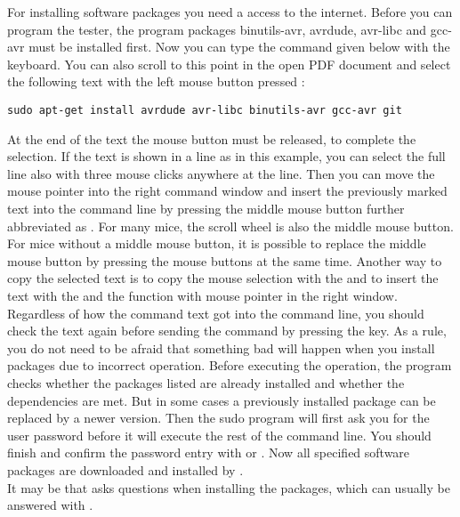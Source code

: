 For installing software packages you need a access to the internet.
Before you can program the tester, the program packages
binutils-avr, avrdude, avr-libc and gcc-avr must be installed first.
Now you can type the command given below with the keyboard.
You can also scroll to this point in the open PDF document and select the
following text with the left mouse button pressed \LMB :
\begin{large} \vspace{-0.4em} \begin{verbatim}
sudo apt-get install avrdude avr-libc binutils-avr gcc-avr git
\end{verbatim} \end{large}
At the end of the text the mouse button \LMB must be released,
to complete the selection.
If the text is shown in a line as in this example, you can select the full line also
with three \LMB mouse clicks anywhere at the line.
Then you can move the mouse pointer into the right command window and
insert the previously marked text into the command line by pressing the
middle mouse button {further abbreviated as \MMB }.
For many mice, the scroll wheel is also the middle mouse button.
For mice without a middle mouse button, it is possible to replace the middle mouse button
by pressing the \LRMB mouse buttons at the same time.
Another way to copy the selected text is to copy the mouse selection with the
 and to insert the text with the \RMB and the function 
 with mouse pointer in the right window.
Regardless of how the command text got into the command line,
you should check the text again before sending the command by pressing the \keys{\enter} key.
As a rule, you do not need to be afraid that something bad will happen when you install packages
due to incorrect operation.
Before executing the operation, the  program checks whether the packages listed
are already installed and whether the dependencies are met.
But in some cases a previously installed package can be replaced by a newer version.
Then the sudo program will first ask you for the user password before it
will execute the rest of the command line.
You should finish and confirm the password entry with \keys{\enter} or \keys{\return}. 
Now all specified software packages are downloaded and installed by .\\

It may be that  asks questions when installing the packages,
which can usually be answered with .

